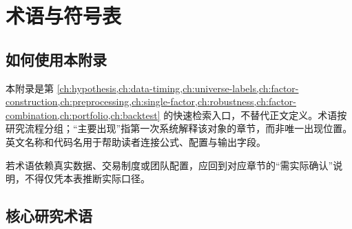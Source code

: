 \chapter{术语与符号表}
\label{app:glossary}

\section{如何使用本附录}

本附录是第 \cref{ch:hypothesis,ch:data-timing,ch:universe-labels,ch:factor-construction,ch:preprocessing,ch:single-factor,ch:robustness,ch:factor-combination,ch:portfolio,ch:backtest} 的快速检索入口，不替代正文定义。术语按研究流程分组；“主要出现”指第一次系统解释该对象的章节，而非唯一出现位置。英文名称和代码名用于帮助读者连接公式、配置与输出字段。

若术语依赖真实数据、交易制度或团队配置，应回到对应章节的“需实际确认”说明，不得仅凭本表推断实际口径。

\section{核心研究术语}

